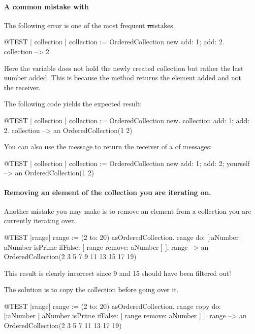 \documentclass[a4paper,10pt,twoside]{book}
\begin{document}
\paragraph{A common mistake with } The following error is one of the most frequent \st mistakes.

\begin{code}{@TEST | collection | }
collection := OrderedCollection new add: 1; add: 2.
collection --> 2
\end{code}
\noindent
Here the variable  does not hold the newly created collection but rather the last number added. 
This is because the method  returns the element added and not the receiver.

The following code yields the expected result:
\begin{code}{@TEST | collection |}
collection := OrderedCollection new.
collection add: 1; add: 2.
collection --> an OrderedCollection(1 2)
\end{code}

You can also use the message  to return the receiver of a  of messages:

\begin{code}{@TEST | collection |}
collection := OrderedCollection new add: 1; add: 2; yourself --> an OrderedCollection(1 2)
\end{code}

\paragraph{Removing an element of the collection you are iterating on.} Another mistake you may make is to remove an element from a collection you are currently iterating over.
\begin{code}{@TEST |range|}
range := (2 to: 20) asOrderedCollection.
range do: [:aNumber | aNumber isPrime ifFalse: [ range remove: aNumber ] ].
range --> an OrderedCollection(2 3 5 7 9 11 13 15 17 19)
\end{code}
\noindent
This result is clearly incorrect since 9 and 15 should have been filtered out!

The solution is to copy the collection before going over it.
\begin{code}{@TEST |range|}
range := (2 to: 20) asOrderedCollection.
range copy do: [:aNumber | aNumber isPrime ifFalse: [ range remove: aNumber ] ].
range --> an OrderedCollection(2 3 5 7 11 13 17 19)
\end{code}
\end{document}
